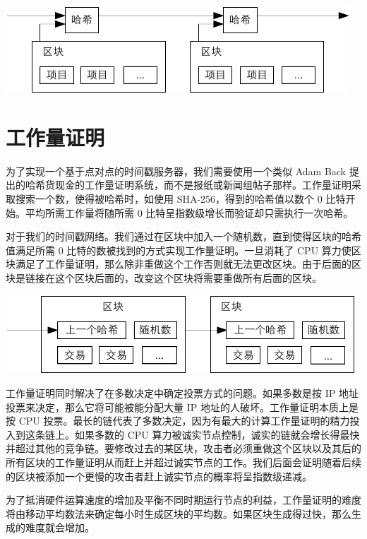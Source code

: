 \documentclass{article}
\begin{document}
\begin{center}
 \includegraphics{bitcoin-zh-cn-2}
\end{center}

\section{工作量证明}
为了实现一个基于点对点的时间戳服务器，我们需要使用一个类似 Adam Back 提出的哈希货现金\cite{Back}的工作量证明系统，而不是报纸或新闻组帖子那样。工作量证明采取搜索一个数，使得被哈希时，如使用 SHA-256，得到的哈希值以数个 0 比特开始。平均所需工作量将随所需 0 比特呈指数级增长而验证却只需执行一次哈希。

对于我们的时间戳网络。我们通过在区块中加入一个随机数，直到使得区块的哈希值满足所需 0 比特的数被找到的方式实现工作量证明。一旦消耗了 CPU 算力使区块满足了工作量证明，那么除非重做这个工作否则就无法更改区块。由于后面的区块是链接在这个区块后面的，改变这个区块将需要重做所有后面的区块。

\begin{center}
 \includegraphics{bitcoin-zh-cn-3}
\end{center}

工作量证明同时解决了在多数决定中确定投票方式的问题。如果多数是按 IP 地址投票来决定，那么它将可能被能分配大量 IP 地址的人破坏。工作量证明本质上是按 CPU 投票。最长的链代表了多数决定，因为有最大的计算工作量证明的精力投入到这条链上。如果多数的 CPU 算力被诚实节点控制，诚实的链就会增长得最快并超过其他的竞争链。要修改过去的某区块，攻击者必须重做这个区块以及其后的所有区块的工作量证明从而赶上并超过诚实节点的工作。我们后面会证明随着后续的区块被添加一个更慢的攻击者赶上诚实节点的概率将呈指数级递减。

为了抵消硬件运算速度的增加及平衡不同时期运行节点的利益，工作量证明的难度将由移动平均数法来确定每小时生成区块的平均数。如果区块生成得过快，那么生成的难度就会增加。
\end{document}
